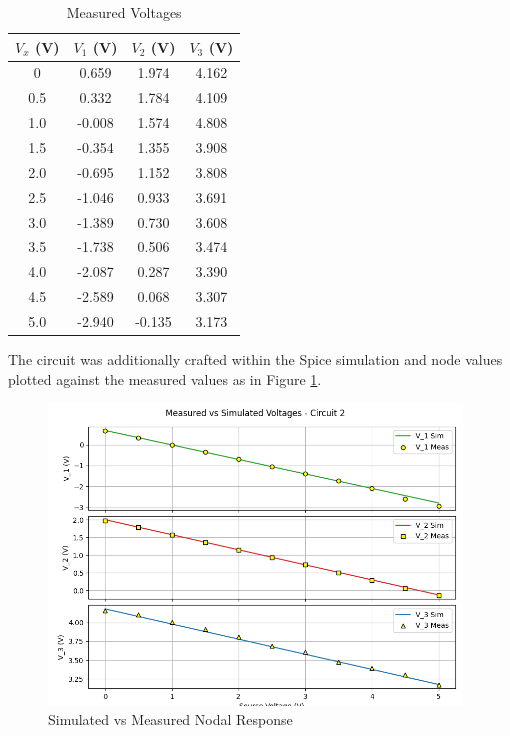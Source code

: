 \documentclass[12pt]{article}
\begin{document}
\begin{table}[H]
	\centering
	\begin{tabular}{|c|c|c|c|}
		\hline
		$V_x$ (V) & $V_1$ (V) & $V_2$ (V) & $V_3$ (V) \\
		\hline
		0         & 0.659     & 1.974     & 4.162     \\
		\hline
		0.5       & 0.332     & 1.784     & 4.109     \\
		\hline
		1.0       & -0.008    & 1.574     & 4.808     \\
		\hline
		1.5       & -0.354    & 1.355     & 3.908     \\
		\hline
		2.0       & -0.695    & 1.152     & 3.808     \\
		\hline
		2.5       & -1.046    & 0.933     & 3.691     \\
		\hline
		3.0       & -1.389    & 0.730     & 3.608     \\
		\hline
		3.5       & -1.738    & 0.506     & 3.474     \\
		\hline
		4.0       & -2.087    & 0.287     & 3.390     \\
		\hline
		4.5       & -2.589    & 0.068     & 3.307     \\
		\hline
		5.0       & -2.940    & -0.135    & 3.173     \\
		\hline
	\end{tabular}
	\caption{Measured Voltages}
	\label{table:measuredvolts}
\end{table}
The circuit was additionally crafted within the Spice simulation and node
values plotted
against the measured values as in Figure \ref{fig:measltspice}.
\begin{figure}[H]
	\centering
	\includegraphics[height=8cm]{06_04}
	\caption{Simulated vs Measured Nodal Response}
	\label{fig:measltspice}
\end{figure}
\end{document}
